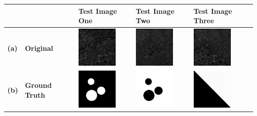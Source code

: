 \begin{minipage}{\linewidth}
	\begin{center}
		\label{tab:human_lesion} 
		\begin{tabular}{>{\bfseries\centering}m{0.2in} >{\centering\bfseries}m{1in} >{\centering}m{1in} >{\centering}m{1in} >{\centering\arraybackslash}m{1in}}
			\hline
			&
			&
			\textbf{Test Image One}
			&
			\textbf{Test Image Two}
			&
			\textbf{Test Image Three}
			\\ 
			\hline
			(a)
			&
			Original
			&
			\includegraphics[width=75px, frame]{figures/accuracy_maps/if_fill/adh_dcis_01_dcis_bg.png}
			&
			\includegraphics[width=75px, frame]{figures/accuracy_maps/if_fill/adh_dcis_02_adh_bg.png}
			& 
			\includegraphics[width=75px, frame]{figures/accuracy_maps/if_fill/adh_dcis_02_adh_top_right.png}
			\\ 
			\hline
			(b)
			&
			Ground Truth
			&
			\includegraphics[width=75px, frame]{figures/accuracy_maps/ground_truth_brick_gravel_01.png}
			&
			\includegraphics[width=75px, frame]{figures/accuracy_maps/ground_truth_brick_gravel_02.png}
			& 
			\includegraphics[width=75px, frame]{figures/accuracy_maps/if_fill/adh_dcis_510.png}

\end{tabular}
\end{center}
\end{minipage}
